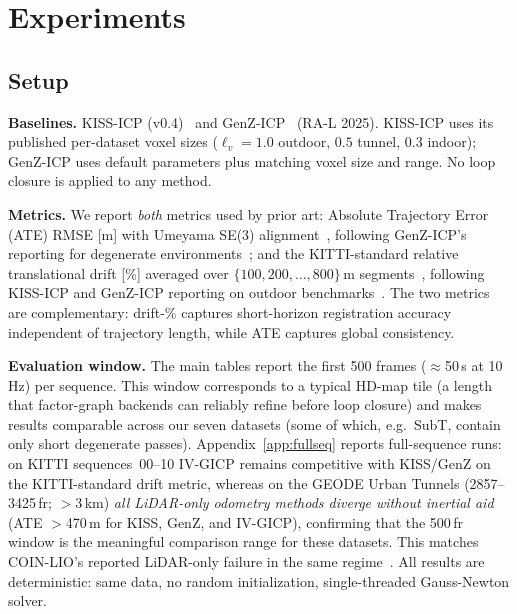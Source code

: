 \documentclass[journal,letterpaper,10pt]{IEEEtran}
\begin{document}
\section{Experiments}\label{sec:experiments}

\subsection{Setup}

\textbf{Baselines.}
KISS-ICP (v0.4)~\cite{vizzo2023kiss} and
GenZ-ICP~\cite{zhang2024genz} (RA-L 2025).
KISS-ICP uses its published per-dataset voxel sizes
($\ell_v{=}1.0$ outdoor, $0.5$ tunnel, $0.3$ indoor);
GenZ-ICP uses default parameters plus matching voxel size and range.
No loop closure is applied to any method.

\textbf{Metrics.}
We report \emph{both} metrics used by prior art:
Absolute Trajectory Error (ATE) RMSE [m] with Umeyama SE(3)
alignment~\cite{umeyama1991least}, following GenZ-ICP's
reporting for degenerate environments~\cite{zhang2024genz};
and the KITTI-standard relative translational drift [\%] averaged
over $\{100,200,\ldots,800\}$\,m segments~\cite{geiger2013kitti},
following KISS-ICP and GenZ-ICP reporting on outdoor
benchmarks~\cite{vizzo2023kiss,zhang2024genz}.
The two metrics are complementary: drift-\% captures short-horizon
registration accuracy independent of trajectory length, while ATE
captures global consistency.

\textbf{Evaluation window.}
The main tables report the first 500 frames ($\approx$50\,s at 10\,Hz)
per sequence. This window corresponds to a typical HD-map tile (a
length that factor-graph backends can reliably refine before loop
closure) and makes results comparable across our seven datasets (some
of which, e.g.\ SubT, contain only short degenerate passes).
Appendix~\ref{app:fullseq} reports full-sequence runs: on KITTI
sequences~00--10 IV-GICP remains competitive with KISS/GenZ on the
KITTI-standard drift metric, whereas on the GEODE Urban Tunnels
(2857--3425\,fr; $>$3\,km) \emph{all LiDAR-only odometry methods
diverge without inertial aid} (ATE $>$470\,m for KISS, GenZ, and
IV-GICP), confirming that the 500\,fr window is the meaningful
comparison range for these datasets. This matches COIN-LIO's reported
LiDAR-only failure in the same regime~\cite{pfreundschuh2024coinlio}.
All results are deterministic: same data, no random initialization,
single-threaded Gauss-Newton solver.
\end{document}
